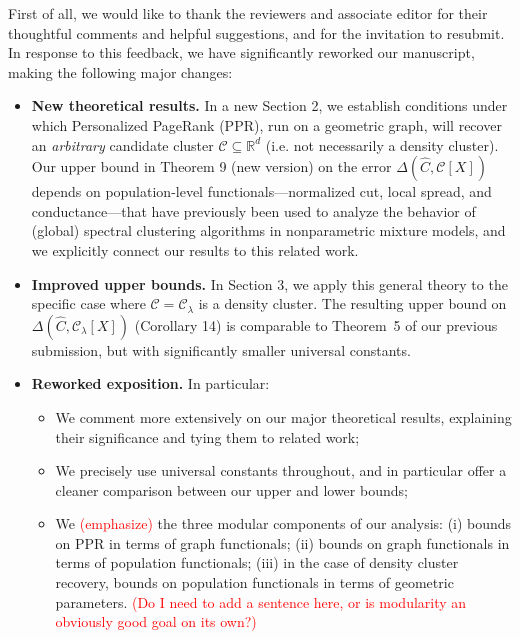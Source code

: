 \documentclass{article}
\newcommand{\Reals}{\mathbb{R}}
\newcommand{\1}{\mathbf{1}}
\newcommand{\Rd}{\Reals^d}
\newcommand{\mc}[1]{\mathcal{#1}}
\newcommand{\wh}[1]{\widehat{#1}}
\theoremstyle{alden}
\theoremstyle{aldenthm}
\theoremstyle{definition}
\theoremstyle{remark}
\begin{document}
First of all, we would like to thank the reviewers and associate editor for their thoughtful comments and helpful suggestions, and for the invitation to resubmit. In response to this feedback, we have significantly reworked our manuscript, making the following major changes: 

\begin{itemize}
	\item \textbf{New theoretical results.} In a new Section 2, we establish conditions under which Personalized PageRank (PPR), run on a geometric graph, will recover an \emph{arbitrary} candidate cluster $\mc{C} \subseteq \Rd$ (i.e. not necessarily a density cluster).  Our upper bound in Theorem 9 (new version) on the error $\Delta(\wh{C},\mc{C}[X])$ depends on population-level functionals---normalized cut, local spread, and conductance---that have previously been used to analyze the behavior of (global) spectral clustering algorithms in nonparametric mixture models, and we explicitly connect our results to this related work.
	
	\item \textbf{Improved upper bounds.} In Section 3, we apply this general theory to the specific case where $\mc{C} = \mc{C}_{\lambda}$ is a density cluster. The resulting upper bound on $\Delta(\wh{C},\mc{C}_{\lambda}[X])$ (Corollary 14) is comparable to Theorem~5 of our previous submission, but with significantly smaller universal constants.
	
	\item \textbf{Reworked exposition.} In particular: 
	\begin{itemize}
		\item We comment more extensively on our major theoretical results, explaining their significance and tying them to related work;
		\item We precisely use universal constants throughout, and in particular offer a cleaner comparison between our upper and lower bounds;
		\item We \textcolor{red}{(emphasize)} the three modular components of our analysis: (i) bounds on PPR in terms of graph functionals; (ii) bounds on graph functionals in terms of population functionals; (iii) in the case of density cluster recovery, bounds on population functionals in terms of geometric parameters. \textcolor{red}{(Do I need to add a sentence here, or is modularity an obviously good goal on its own?)}
	\end{itemize}
\end{itemize}
\end{document}
